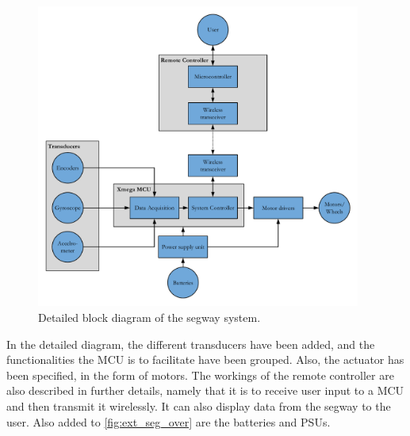 \begin{figure}[H]
\centering
\includegraphics[width = 0.95\textwidth]{figures/extendedOverview.pdf}
\caption{Detailed block diagram of the segway system.}
\label{fig:ext_seg_over}
\end{figure}

In the detailed diagram, the different transducers have been added, and the functionalities the MCU is to facilitate have been grouped. Also, the actuator has been specified, in the form of motors.
The workings of the remote controller are also described in further details, namely that it is to receive user input to a MCU and then transmit it wirelessly. It can also display data from the segway to the user. Also added to \autoref{fig:ext_seg_over} are the batteries and PSUs. 

